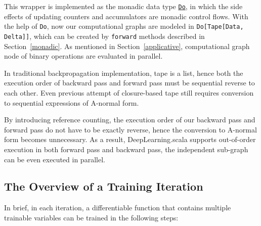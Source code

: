 This wrapper is implemented as the monadic data type \href{https://javadoc.io/page/com.thoughtworks.raii/asynchronous_2.11/latest/com/thoughtworks/raii/asynchronous%24%24Do.html}{\lstinline{Do}}, in which the side effects of updating counters and accumulators are monadic control flows. With the help of \lstinline{Do}, now our \glspl{computational graph} are modeled in \lstinline{Do[Tape[Data, Delta]]}, which can be created by \lstinline{forward} methods described in Section~\ref{monadic}. As mentioned in Section~\ref{applicative}, \gls{computational graph} node of binary operations are evaluated in parallel.

In traditional backpropagation implementation, tape is a list, hence both the execution order of backward pass and forward pass must be sequential reverse to each other. Even previous attempt of closure-based tape\cite{pearlmutter2008reverse} still requires conversion to sequential expressions of A-normal form\cite{sabry1993reasoning}. 

By introducing reference counting, the execution order of our backward pass and forward pass do not have to be exactly reverse, hence the conversion to A-normal form becomes unnecessary. As a result, DeepLearning.scala supports out-of-order execution in both forward pass and backward pass, the independent sub-graph can be even executed in parallel.

\subsection{The Overview of a Training Iteration}
\label{training iteration}

In brief, in each iteration, a \gls{differentiable function} that contains multiple \glspl{trainable variable} can be trained in the following steps:

